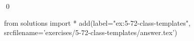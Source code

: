 
\begin{ex}
  \label{ex:5-72-class-templates}
  
  \qed
\end{ex}
\begin{python0}
from solutions import *
add(label="ex:5-72-class-templates",
    srcfilename='exercises/5-72-class-templates/answer.tex')
\end{python0}
